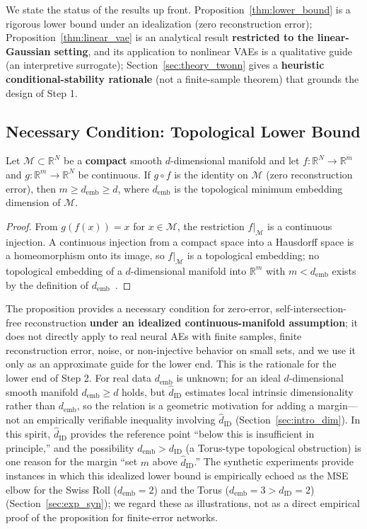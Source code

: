 \documentclass[make,article,submit,pdftex,moreauthors]{Definitions/mdpi}
\newcommand{\dID}{d_{\mathrm{ID}}}
\newcommand{\hatdID}{\hat{d}_{\mathrm{ID}}}
\newcommand{\R}{\mathbb{R}}
\newcommand{\demb}{d_{\mathrm{emb}}}
\begin{document}
We state the status of the results up front.
Proposition~\ref{thm:lower_bound} is a rigorous lower bound under an
idealization (zero reconstruction error);
Proposition~\ref{thm:linear_vae} is an analytical result
\textbf{restricted to the linear-Gaussian setting}, and its application to
nonlinear VAEs is a qualitative guide (an interpretive surrogate);
Section~\ref{sec:theory_twonn} gives a \textbf{heuristic
conditional-stability rationale} (not a finite-sample theorem) that
grounds the design of Step 1.

\subsection{Necessary Condition: Topological Lower Bound}\label{sec:theory_lower}

\begin{Proposition}\label{thm:lower_bound}
Let $\mathcal{M} \subset \R^N$ be a \textbf{compact} smooth $d$-dimensional
manifold and let $f: \R^N \to \R^m$ and $g: \R^m \to \R^N$ be continuous.
If $g \circ f$ is the identity on $\mathcal{M}$ (zero reconstruction
error), then $m \geq \demb \geq d$, where $\demb$ is the topological
minimum embedding dimension of $\mathcal{M}$.
\end{Proposition}

\begin{proof}
From $g(f(x)) = x$ for $x \in \mathcal{M}$, the restriction
$f|_\mathcal{M}$ is a continuous injection.
A continuous injection from a compact space into a Hausdorff space is a
homeomorphism onto its image, so $f|_\mathcal{M}$ is a topological
embedding; no topological embedding of a $d$-dimensional manifold into
$\R^m$ with $m < \demb$ exists by the definition of
$\demb$~\cite{hatcher2002algebraic}.
\end{proof}

The proposition provides a necessary condition for zero-error,
self-intersection-free reconstruction \textbf{under an idealized
continuous-manifold assumption}; it does not directly apply to real neural
AEs with finite samples, finite reconstruction error, noise, or
non-injective behavior on small sets, and we use it only as an approximate
guide for the lower end.
This is the rationale for the lower end of Step 2.
For real data $\demb$ is unknown; for an ideal $d$-dimensional smooth
manifold $\demb \geq d$ holds, but $\hatdID$ estimates local intrinsic
dimensionality rather than $\demb$, so the relation is a geometric
motivation for adding a margin---not an empirically verifiable inequality
involving $\hatdID$ (Section~\ref{sec:intro_dim}).
In this spirit, $\hatdID$ provides the reference point ``below this is
insufficient in principle,'' and the possibility $\demb > \dID$ (a
Torus-type topological obstruction) is one reason for the margin ``set $m$
above $\hatdID$.''
The synthetic experiments provide instances in which this idealized lower
bound is empirically echoed as the MSE elbow for the Swiss Roll
($\demb = 2$) and the Torus ($\demb = 3 > \dID = 2$)
(Section~\ref{sec:exp_syn}); we regard these as illustrations, not as a
direct empirical proof of the proposition for finite-error networks.
\end{document}
